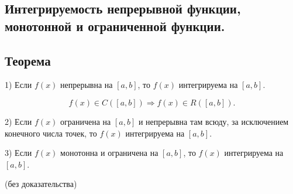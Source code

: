 {
\subsection{Интегрируемость непрерывной функции, монотонной и ограниченной функции.}
\subsection*{Теорема}

1) Если \( f(x) \) непрерывна на \( [a, b] \), то \( f(x) \) интегрируема на \( [a, b] \).


\[
f(x) \in C([a, b]) \Rightarrow f(x) \in R([a, b]).
\]



2) Если \( f(x) \) ограничена на \( [a, b] \) и непрерывна там всюду, за исключением конечного числа точек, то \( f(x) \) интегрируема на \( [a, b] \).

3) Если \( f(x) \) монотонна и ограничена на \( [a, b] \), то \( f(x) \) интегрируема на \( [a, b] \).

(без доказательства)

}